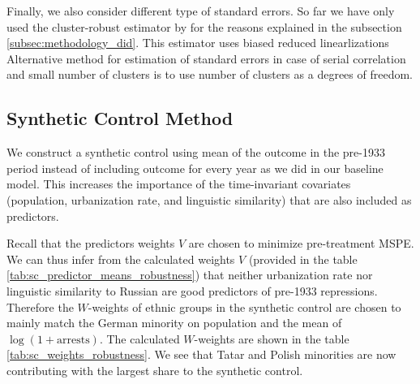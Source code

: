 
Finally, we also consider different type of standard errors. 
So far we have only used the cluster-robust estimator by \citet{pustejovsky_small-sample_2018} for the reasons explained in the subsection \ref{subsec:methodology_did}. 
This estimator uses biased reduced linearlizations
Alternative method for estimation of standard errors  in case of serial correlation and small number of clusters is to use number of clusters as a degrees of freedom. 
\subsection{Synthetic Control Method}
 We construct a synthetic control  using mean of the outcome in the pre-1933 period instead of including outcome for every year as we did in our baseline model. This increases the importance of the time-invariant covariates (population, urbanization rate, and linguistic similarity) that are also included as predictors.


Recall that the predictors weights $V$ are chosen to minimize pre-treatment MSPE. We can thus infer from the calculated  weights $V$ (provided in the table \ref{tab:sc_predictor_means_robustness})  that neither urbanization rate nor linguistic similarity to Russian are good predictors of pre-1933 repressions. 
Therefore the $W$-weights of ethnic groups in the synthetic control are chosen to mainly match the German minority on population and the mean of $\log\left(1 + \text{arrests}\right)$. 
 The calculated $W$-weights  are shown in the table \ref{tab:sc_weights_robustness}. We see that Tatar and Polish minorities are now contributing with the largest share to the synthetic control. 



